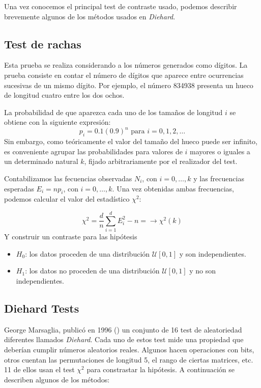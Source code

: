 Una vez conocemos el principal test de contraste usado, podemos describir brevemente algunos de los métodos usados en \textit{Diehard}.

\subsection{Test de rachas}

Esta prueba se realiza considerando a los números generados como dígitos. La prueba consiste en contar el número de dígitos que aparece entre ocurrencias sucesivas de un mismo dígito. Por ejemplo, el número 834938 presenta un hueco de longitud cuatro entre los dos ochos.

La probabilidad de que aparezca cada uno de los tamaños de longitud $i$ se obtiene con la siguiente expresión:
\[
p_i=0.1(0.9)^n \,\, \text{para } i=0,1,2,\ldots
\]
Sin embargo, como teóricamente el valor del tamaño del hueco puede ser infinito, es conveniente agrupar las probabilidades para valores de $i$ mayores o iguales a un determinado natural $k$, fijado arbitrariamente por el realizador del test.

Contabilizamos las fecuencias observadas $N_i$, con $i=0, \ldots, k$ y las frecuencias esperadas $E_i=np_i$, con $i=0, \ldots, k$. Una vez obtenidas ambas frecuencias, podemos calcular el valor del estadístico $\chi^2$:

\[
\chi^2=\frac{d}{n}\sum_{i=1}^dE_i^2-n=\longrightarrow \chi^2(k)
\]
Y construir un contraste para las hipótesis
\begin{itemize}
\item $H_0$: los datos proceden de una distribución $\mathcal{U}[0,1]$ y son independientes.
\item $H_1$: los datos no proceden de una distribución $\mathcal{U}[0,1]$ y no son independientes.
\end{itemize}

\subsection{Diehard Tests}

George Marsaglia, publicó en 1996 (\cite{marsaglia1996}) un conjunto de 16 test de aleatoriedad diferentes llamados \textit{Diehard}. Cada uno de estos test mide una propiedad que deberían cumplir números aleatorios reales. Algunos hacen operaciones con bits, otros cuentan las permutaciones de longitud 5,  el rango de ciertas matrices, etc. 11 de ellos usan el test $\chi^2$ para constrastar la hipótesis. A continuación se describen algunos de los métodos:

